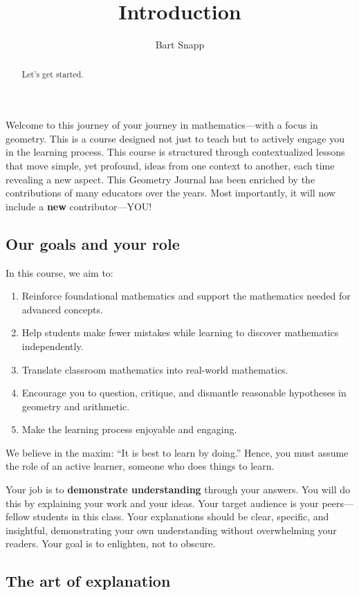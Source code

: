 \documentclass[handout,nooutcomes,noauthor,12pt]{ximera}
\title{Introduction}
\author{Bart Snapp}
\begin{document}
\begin{abstract}
  Let's get started.
\end{abstract}
\maketitle

Welcome to this journey of your journey in mathematics---with a focus in
geometry. This is a course designed not just to teach but to actively engage
you in the learning process. This course is structured through contextualized
lessons that move simple, yet profound, ideas from  one context to another,
each time revealing a new aspect. This Geometry Journal has been enriched by the
contributions of many educators over the years. Most importantly, it will now
include a \textbf{new} contributor---YOU!

\subsection*{Our goals and your role}

In this course, we aim to:
\begin{enumerate}
  \item Reinforce foundational mathematics and support the mathematics needed
        for
        advanced concepts.
  \item Help students make fewer mistakes while learning to discover
        mathematics
        independently.
  \item Translate classroom mathematics into real-world mathematics.
  \item Encourage you to question, critique, and dismantle reasonable
        hypotheses in geometry and arithmetic.
  \item Make the learning process enjoyable and engaging.
\end{enumerate}

We believe in the maxim: ``It is best to learn by doing.'' Hence, you must
assume the  role  of an active learner, someone who does things to learn.

Your job is to \textbf{demonstrate understanding} through your
answers. You will do this by explaining your work and your ideas.
Your target audience is your peers—fellow students in this class. Your
explanations should be clear, specific, and insightful, demonstrating
your own understanding without overwhelming your readers. Your goal is
to enlighten, not to obscure.

\subsection*{The art of explanation}
\end{document}
